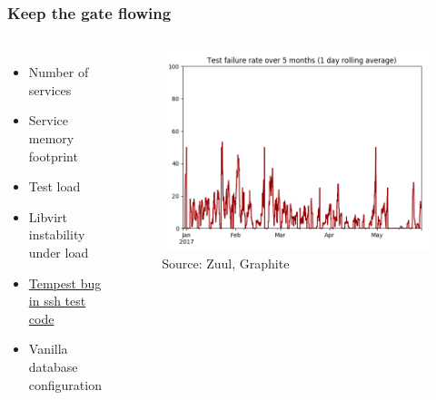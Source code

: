 \documentclass[aspectratio=169,11pt,hyperref={colorlinks=true}]{beamer}
\begin{document}
\begin{frame}
    \frametitle{Keep the gate flowing}
       \begin{columns}
    \begin{itemize}
        \item{Number of services}
        \item{Service memory footprint}
        \item{Test load}
        \item{Libvirt instability under load}
        \item{\href{https://review.openstack.org/\#/c/439638/}{Tempest bug in ssh test code}}
        \item{Vanilla database configuration}
    \end{itemize}
    \begin{figure}
    \begin{center}
    	\includegraphics[width=1\textwidth]{failure_rate.png}
         \caption{Source: Zuul, Graphite}
    \end{center}
    \end{figure}
       \end{columns}
\end{frame}

\end{document}
